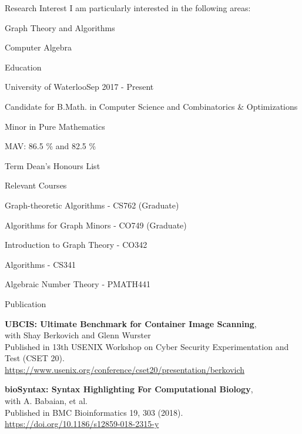 \documentclass{cv}
\begin{document}
\begin{rSection}{Research Interest}
I am particularly interested in the following areas:
\begin{rSubsectionPure}
	\item Graph Theory and Algorithms
	\item Computer Algebra
\end{rSubsectionPure}
\end{rSection}

\begin{rSection}{Education}
\begin{rSubsection}{University of Waterloo}{Sep 2017 - Present}{}{}
	\item Candidate for B.Math. in Computer Science and Combinatorics \& Optimizations
	\item Minor in Pure Mathematics
  \item MAV: 86.5 \% and 82.5 \%
	\item Term Dean's Honours List
\end{rSubsection}

\begin{rSubsection}{Relevant Courses}{}{}{}
  \item Graph-theoretic Algorithms - CS762 (Graduate)
  \item Algorithms for Graph Minors - CO749 (Graduate)
  \item Introduction to Graph Theory - CO342
  \item Algorithms - CS341
	\item Algebraic Number Theory - PMATH441
\end{rSubsection}
\end{rSection}

\begin{rSection}{Publication}
\begin{rSubsectionPure}
	\item \textbf{{UBCIS}: Ultimate Benchmark for Container Image Scanning}, \\
	with Shay Berkovich and Glenn Wurster \\
	Published in 13th {USENIX} Workshop on Cyber Security Experimentation and Test ({CSET} 20). \\
	\href{https://www.usenix.org/conference/cset20/presentation/berkovich}{https://www.usenix.org/conference/cset20/presentation/berkovich}
\end{rSubsectionPure}

\begin{rSubsectionPure}
	\item \textbf{bioSyntax: Syntax Highlighting For Computational Biology}, \\
	with A. Babaian, et al. \\
	Published in BMC Bioinformatics 19, 303 (2018). \\
	\href{https://doi.org/10.1186/s12859-018-2315-y}{https://doi.org/10.1186/s12859-018-2315-y}
\end{rSubsectionPure}
\end{rSection}
\end{document}
